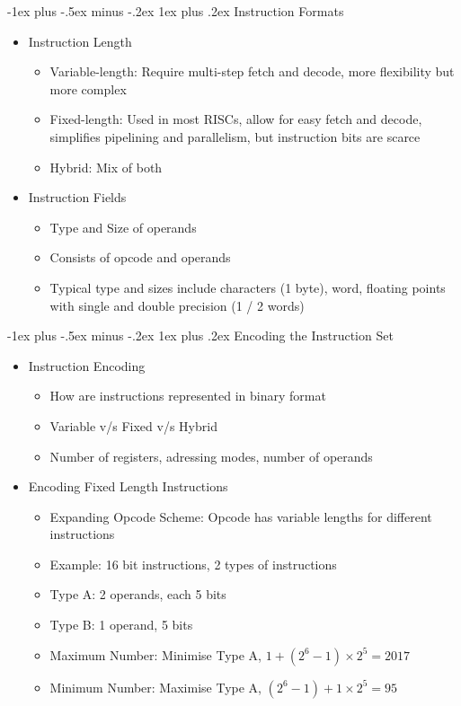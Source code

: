 \documentclass[10pt, portrait]{article}
\makeatletter
\renewcommand{\subsection}{\@startsection{subsection}{3}{0mm}%
                                {-1ex plus -.5ex minus -.2ex}%
                                {1ex plus .2ex}%
                                {\normalfont\small\bfseries}}%
\makeatother
\begin{document}
\begin{multicols*}{2}
\subsection{Instruction Formats}
\begin{itemize}
    \item Instruction Length
    \begin{itemize}
        \item Variable-length: Require multi-step fetch and decode, more flexibility but more complex
        \item Fixed-length: Used in most RISCs, allow for easy fetch and decode, simplifies pipelining and parallelism, but instruction bits are scarce
        \item Hybrid: Mix of both
    \end{itemize}
    \item Instruction Fields
    \begin{itemize}
        \item Type and Size of operands
        \item Consists of opcode and operands
        \item Typical type and sizes include characters (1 byte), word, floating points with single and double precision (1 / 2 words)
    \end{itemize}
\end{itemize}

\subsection{Encoding the Instruction Set}
\begin{itemize}
    \item Instruction Encoding
    \begin{itemize}
        \item How are instructions represented in binary format
        \item Variable v/s Fixed v/s Hybrid
        \item Number of registers, adressing modes, number of operands
    \end{itemize}
    \item Encoding Fixed Length Instructions
    \begin{itemize}
        \item Expanding Opcode Scheme: Opcode has variable lengths for different instructions
        \item Example: 16 bit instructions, 2 types of instructions
        \item Type A: 2 operands, each 5 bits
        \item Type B: 1 operand, 5 bits
        \item Maximum Number: Minimise Type A, $1 + (2^6-1) \times 2^5=2017$
        \item Minimum Number: Maximise Type A, $(2^6-1) + 1 \times 2^5=95$
    \end{itemize}
\end{itemize}


\end{multicols*}
\end{document}
